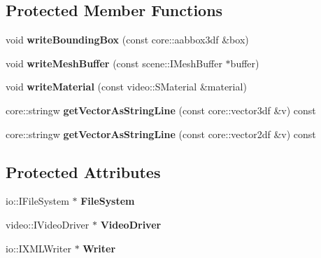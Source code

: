 \subsection*{Protected Member Functions}
\begin{DoxyCompactItemize}
\item 
\hypertarget{classirr_1_1scene_1_1_c_irr_mesh_writer_ae3c848c99f37d9e01c2742807c0a6e12}{void {\bfseries write\-Bounding\-Box} (const core\-::aabbox3df \&box)}\label{classirr_1_1scene_1_1_c_irr_mesh_writer_ae3c848c99f37d9e01c2742807c0a6e12}

\item 
\hypertarget{classirr_1_1scene_1_1_c_irr_mesh_writer_a70cadda96e5d980b3397205d25509be7}{void {\bfseries write\-Mesh\-Buffer} (const scene\-::\-I\-Mesh\-Buffer $\ast$buffer)}\label{classirr_1_1scene_1_1_c_irr_mesh_writer_a70cadda96e5d980b3397205d25509be7}

\item 
\hypertarget{classirr_1_1scene_1_1_c_irr_mesh_writer_a304ff281feed8df43dc0beaf104b772d}{void {\bfseries write\-Material} (const video\-::\-S\-Material \&material)}\label{classirr_1_1scene_1_1_c_irr_mesh_writer_a304ff281feed8df43dc0beaf104b772d}

\item 
\hypertarget{classirr_1_1scene_1_1_c_irr_mesh_writer_aa7f9dbf1dccde36b964066fc8a9e6811}{core\-::stringw {\bfseries get\-Vector\-As\-String\-Line} (const core\-::vector3df \&v) const }\label{classirr_1_1scene_1_1_c_irr_mesh_writer_aa7f9dbf1dccde36b964066fc8a9e6811}

\item 
\hypertarget{classirr_1_1scene_1_1_c_irr_mesh_writer_abbc5844e722cab6926186bd3877d4c4c}{core\-::stringw {\bfseries get\-Vector\-As\-String\-Line} (const core\-::vector2df \&v) const }\label{classirr_1_1scene_1_1_c_irr_mesh_writer_abbc5844e722cab6926186bd3877d4c4c}

\end{DoxyCompactItemize}
\subsection*{Protected Attributes}
\begin{DoxyCompactItemize}
\item 
\hypertarget{classirr_1_1scene_1_1_c_irr_mesh_writer_a18777ec0e3f6ca6385f180a97c876922}{io\-::\-I\-File\-System $\ast$ {\bfseries File\-System}}\label{classirr_1_1scene_1_1_c_irr_mesh_writer_a18777ec0e3f6ca6385f180a97c876922}

\item 
\hypertarget{classirr_1_1scene_1_1_c_irr_mesh_writer_a54e39b6b0288bc01e0fe5e374fe31aae}{video\-::\-I\-Video\-Driver $\ast$ {\bfseries Video\-Driver}}\label{classirr_1_1scene_1_1_c_irr_mesh_writer_a54e39b6b0288bc01e0fe5e374fe31aae}

\item 
\hypertarget{classirr_1_1scene_1_1_c_irr_mesh_writer_a1b8b1ea089f04d07a3289d13aca9c55a}{io\-::\-I\-X\-M\-L\-Writer $\ast$ {\bfseries Writer}}\label{classirr_1_1scene_1_1_c_irr_mesh_writer_a1b8b1ea089f04d07a3289d13aca9c55a}

\end{DoxyCompactItemize}


